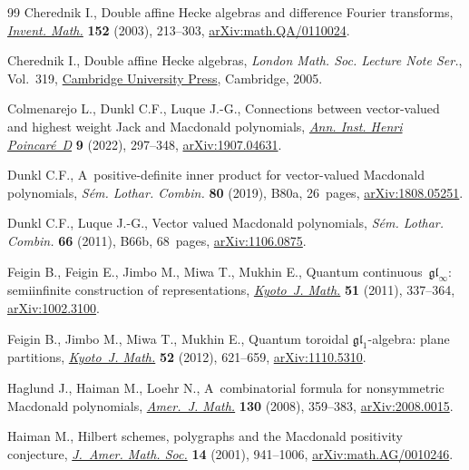 \documentclass[10pt,a4paper]{amsart}
\numberwithin{equation}{section}
\theoremstyle{definition}
\begin{document}
\begin{thebibliography}{99}
Cherednik I., Double affine {H}ecke algebras and difference {F}ourier
 transforms, \href{https://doi.org/10.1007/s00222-002-0240-0}{\textit{Invent.
 Math.}} \textbf{152} (2003), 213--303,
 \href{http://arxiv.org/abs/math.QA/0110024}{arXiv:math.QA/0110024}.

Cherednik I., Double affine {H}ecke algebras, \textit{London Math. Soc. Lecture
 Note Ser.}, Vol.~319,
 \href{https://doi.org/10.1017/CBO9780511546501}{Cambridge University Press},
 Cambridge, 2005.

Colmenarejo L., Dunkl C.F., Luque J.-G., Connections between vector-valued and
 highest weight {J}ack and {M}acdonald polynomials,
 \href{https://doi.org/10.4171/aihpd/119}{\textit{Ann. Inst. Henri
 Poincar\'e~D}} \textbf{9} (2022), 297--348,
 \href{http://arxiv.org/abs/1907.04631}{arXiv:1907.04631}.

Dunkl C.F., A~positive-definite inner product for vector-valued {M}acdonald
 polynomials, \textit{S\'em. Lothar. Combin.} \textbf{80} (2019), B80a,
 26~pages, \href{http://arxiv.org/abs/1808.05251}{arXiv:1808.05251}.

Dunkl C.F., Luque J.-G., Vector valued {M}acdonald polynomials, \textit{S\'em.
 Lothar. Combin.} \textbf{66} (2011), B66b, 68~pages,
 \href{http://arxiv.org/abs/1106.0875}{arXiv:1106.0875}.

Feigin B., Feigin E., Jimbo M., Miwa T., Mukhin E., Quantum
 continuous~{$\mathfrak{gl}_\infty$}: semiinfinite construction of
 representations,
 \href{https://doi.org/10.1215/21562261-1214375}{\textit{Kyoto~J. Math.}}
 \textbf{51} (2011), 337--364,
 \href{http://arxiv.org/abs/1002.3100}{arXiv:1002.3100}.

Feigin B., Jimbo M., Miwa T., Mukhin E., Quantum toroidal
 {$\mathfrak{gl}_1$}-algebra: plane partitions,
 \href{https://doi.org/10.1215/21562261-1625217}{\textit{Kyoto~J. Math.}}
 \textbf{52} (2012), 621--659,
 \href{http://arxiv.org/abs/1110.5310}{arXiv:1110.5310}.

Haglund J., Haiman M., Loehr N., A~combinatorial formula for nonsymmetric
 {M}acdonald polynomials,
 \href{https://doi.org/10.1353/ajm.2008.0015}{\textit{Amer.~J. Math.}}
 \textbf{130} (2008), 359--383,
 \href{http://arxiv.org/abs/2008.0015}{arXiv:2008.0015}.

Haiman M., Hilbert schemes, polygraphs and the {M}acdonald positivity
 conjecture,
 \href{https://doi.org/10.1090/S0894-0347-01-00373-3}{\textit{J.~Amer. Math.
 Soc.}} \textbf{14} (2001), 941--1006,
 \href{http://arxiv.org/abs/math.AG/0010246}{arXiv:math.AG/0010246}.


\end{thebibliography}
\end{document}
